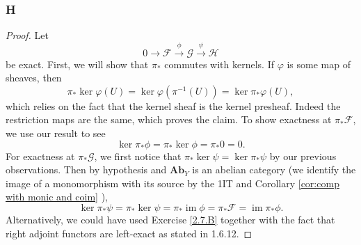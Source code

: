 \documentclass{article}
\newcommand{\fF}{\mathscr{F}}
\newcommand{\fG}{\mathscr{G}}
\newcommand{\fH}{\mathscr{H}}
\newcommand{\Ab}{\mathbf{Ab}} %
\DeclareMathOperator{\im}{\mathrm{im}}
\begin{document}
\subsubsection{H}\label{2.6.H}
\begin{proof}
    Let
    \[
    0\to \fF \xrightarrow{\phi} \fG \xrightarrow{\psi} \fH
    \]
    be exact. First, we will show that $\pi_*$ commutes with kernels. If $\varphi$ is some map of sheaves, then
    \[
    \pi_* \ker \varphi (U) = \ker \varphi (\pi^{-1}(U)) = \ker \pi_* \varphi(U),
    \]
    which relies on the fact that the kernel sheaf is the kernel presheaf. Indeed the restriction maps are the same, which proves the claim. To show exactness at $\pi_* \fF$, we use our result to see
    \[
    \ker \pi_* \phi = \pi_* \ker \phi = \pi_* 0 = 0.
    \]
    For exactness at $\pi_* \fG$, we first notice that $\pi_* \ker \psi = \ker \pi_* \psi$ by our previous observations. Then by hypothesis and $\Ab_Y$ is an abelian category (we identify the image of a monomorphism with its source by the 1IT and Corollary \ref{cor:comp with monic and coim}
    ),
    \[
    \ker \pi_* \psi = \pi_* \ker \psi = \pi_* \im \phi = \pi_* \fF = \im \pi_* \phi.
    \]
    Alternatively, we could have used Exercise \ref{2.7.B} together with the fact that right adjoint functors are left-exact as stated in 1.6.12.
\end{proof}
\end{document}
